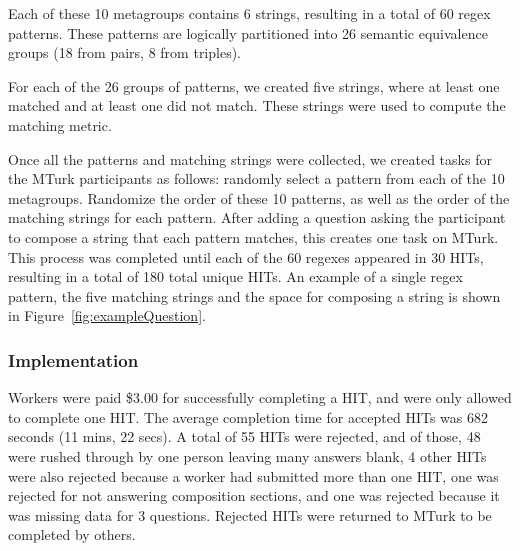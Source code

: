 Each of these 10 metagroups contains 6 strings, resulting in a total of 60 regex patterns.  These patterns are logically partitioned into 26 semantic equivalence groups (18 from pairs, 8 from triples).

For each of the 26 groups of patterns, we created five strings, where at least one matched and at least one did not match. These strings were used to compute the matching metric.

Once all the patterns and matching strings were collected, we created tasks for the MTurk participants as follows:
randomly select a pattern from each of the 10 metagroups. Randomize the order of these 10 patterns, as well as the order of the matching strings for each pattern. After adding a question asking the participant to compose a string that each pattern matches, this creates one task on MTurk.   This process was completed until each of the 60 regexes appeared in 30 HITs, resulting in a total of 180 total unique HITs.
An example of a single regex pattern, the five matching strings and the space for composing a string is shown in Figure~\ref{fig:exampleQuestion}.

\subsubsection{Implementation}
Workers were paid \$3.00 for successfully completing a HIT, and were only allowed to complete  one HIT.  The average completion time for accepted HITs was 682 seconds (11 mins, 22 secs).
A total of 55 HITs were rejected, and  of those, 48 were rushed through by one person leaving many answers blank, 4 other HITs were also rejected because a worker had submitted more than one HIT, one was rejected for not answering composition sections, and one was rejected because it was missing data for 3 questions.  Rejected HITs were returned to MTurk to be completed by others.

